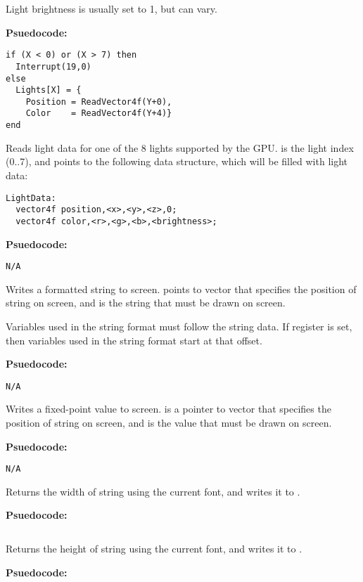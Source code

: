 Light brightness is usually set to 1, but can vary.

\textbf{Psuedocode:}
\begin{verbatim}
if (X < 0) or (X > 7) then
  Interrupt(19,0)
else
  Lights[X] = {
    Position = ReadVector4f(Y+0),
    Color    = ReadVector4f(Y+4)}
end
\end{verbatim}


Reads light data for one of the 8 lights supported by the GPU.  is the light index (0..7), and  points to the following data structure, which will be filled with light data:
\begin{verbatim}
LightData:
  vector4f position,<x>,<y>,<z>,0;
  vector4f color,<r>,<g>,<b>,<brightness>;
\end{verbatim}

\textbf{Psuedocode:}
\begin{verbatim}
N/A
\end{verbatim}


Writes a formatted string to screen.  points to vector that specifies the position of string on screen, and  is the string that must be drawn on screen.

Variables used in the string format must follow the string data. If  register is set, then variables used in the string format start at that offset.

\textbf{Psuedocode:}
\begin{verbatim}
N/A
\end{verbatim}


Writes a fixed-point value to screen.  is a pointer to vector that specifies the position of string on screen, and  is the value that must be drawn on screen.

\textbf{Psuedocode:}
\begin{verbatim}
N/A
\end{verbatim}


Returns the width of string using the current font, and writes it to .

\textbf{Psuedocode:}
\begin{verbatim}
\end{verbatim}


Returns the height of string using the current font, and writes it to .

\textbf{Psuedocode:}
\begin{verbatim}
\end{verbatim}


